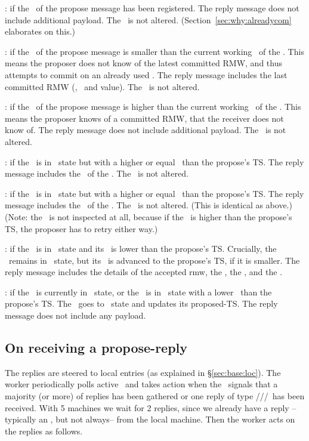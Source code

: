 \squishlist
\item \alreadycom: if the \rmw~of the propose message has been registered.  The reply message does not include additional payload. The \kv~is not altered. (Section~\ref{sec:why:alreadycom} elaborates on this.)

\item \loglow: if the \logno~of the propose message is smaller than the current working
\logno~of the \kv. This means the proposer does not know of the latest committed RMW, and thus attempts to commit on an already used \logno. The reply message includes the last committed RMW (\comlogno, \comrmw~and value). The \kv~is not altered.

\item \loghigh: if the \logno~of the propose message is higher than the current working \logno~of the \kv. This means the proposer knows of a committed RMW, that the receiver does not know of. The reply message does not include additional payload. The \kv~is not altered.

\item \highprop:  if the \kv~is in \proped~state but with a higher or equal \propts~than the propose's TS. The reply message includes the \propts~of the \kv. The \kv~is not altered.

\item \highacc: if the \kv~is in \acced~state but with a higher or equal \propts~than the propose's TS. The reply message includes the \propts~of the \kv. The \kv~is not altered. (This is identical as above.) (Note: the \accts\ is not inspected at all, because if the \propts\ is higher than the propose's TS, the proposer has to retry either way.)

\item \lowacc: if the \kv~is in \acced~state and its \accts~is lower than the propose's TS. Crucially, the \kv~remains in \acced~state, but its \propts~is advanced to the propose's TS, if it is smaller. The reply message includes the details of the accepted rmw, \ie  the \accts, the \rmw, and the \accval. 

\item \ack: if the \kv~is currently in \invalid~state, or the \kv~is in \proped~state with a lower \propts~than the propose's TS.
The \kv~goes to \proped~state and updates its proposed-TS. The reply message does not include any payload.
\squishend


\subsection{On receiving a propose-reply}
The replies are steered to local entries (as explained in \S\ref{sec:base:loc}).
The worker periodically polls active \locentries\ and takes action when the \locentry~signals that a majority (or more) of replies has been gathered or  one reply of type \alreadycom/\loglow/\highprop/\highacc\ has been received. With 5 machines we wait for 2 replies, since we already have a reply --typically an \ack, but not always-- from the local machine. Then the worker acts on the replies as follows.

